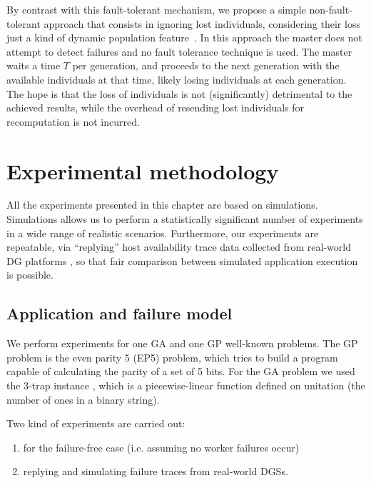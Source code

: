 \documentclass[graybox]{sty/svmult}
\begin{document}
By contrast with this fault-tolerant mechanism, we
propose a simple non-fault-tolerant approach that consists in ignoring lost
individuals, considering their loss just a kind of dynamic population
feature~\cite{dynamic-population-gp,plague,luke:2003:gecco,dynamic-population-variation-gp}.
In this approach the master does not attempt to detect failures and
no fault tolerance technique is used. The master waits a time $T$ per
generation, and proceeds to the next generation with the available individuals at that time,
likely losing individuals at each generation. The hope is that the
loss of individuals is not (significantly) detrimental to the achieved results,
while the overhead of resending
lost individuals for recomputation is not incurred.

\section{Experimental methodology}
\label{experiments-setup}

All the experiments presented in this chapter are based on simulations. Simulations allows us to perform a statistically
significant number of experiments in a wide range of realistic scenarios. Furthermore, our experiments are repeatable, via
``replying'' host availability trace data collected from real-world DG platforms \cite{traces-dgc}, so that fair comparison
between simulated application execution is possible.

\subsection{Application and failure model}

We perform experiments for one GA and one GP well-known problems. The GP problem is the even parity 5 (EP5) problem, which
tries to build a program capable of calculating the parity of a set of 5 bits. For the GA problem we used the 3-trap instance
\cite{ackley:trap}, which is a piecewise-linear function defined on unitation (the number of ones in a binary string).

Two kind of experiments are carried out:
\begin{enumerate}
    \item for the failure-free case (i.e. assuming no worker failures occur)
    \item replying and simulating failure traces from real-world DGSs.
\end{enumerate}
\end{document}
